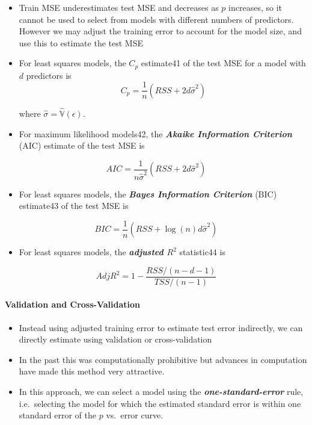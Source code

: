 \documentclass[11pt]{article}
\providecommand{\tightlist}{%
      \setlength{\itemsep}{0pt}\setlength{\parskip}{0pt}}
\begin{document}
    \begin{itemize}
\item
  Train MSE underestimates test MSE and decreases as \(p\) increases, so
  it cannot be used to select from models with different numbers of
  predictors. However we may adjust the training error to account for
  the model size, and use this to estimate the test MSE
\item
  For least squares models, the \textbf{\emph{\(C_p\)}} estimate41 of
  the test MSE for a model with \(d\) predictors is
  \[ C_p = \frac{1}{n}(RSS + 2d\hat{\sigma}^2) \]

  where \(\hat{\sigma} = \hat{\mathbb{V}}(\epsilon)\).
\item
  For maximum likelihood models42, the \textbf{\emph{Akaike Information
  Criterion}} (AIC) estimate of the test MSE is
\end{itemize}

\[ AIC = \frac{1}{n\hat{\sigma}^2}(RSS + 2d\hat{\sigma}^2) \]

\begin{itemize}
\tightlist
\item
  For least squares models, the \textbf{\emph{Bayes Information
  Criterion}} (BIC) estimate43 of the test MSE is
\end{itemize}

\[ BIC = \frac{1}{n}(RSS + \log(n)d\hat{\sigma}^2) \]

\begin{itemize}
\tightlist
\item
  For least squares models, the \textbf{\emph{adjusted \(R^2\)}}
  statistic44 is
\end{itemize}

\[AdjR^2 = 1 - \frac{RSS/(n - d - 1)}{TSS/(n - 1)}\]

    \hypertarget{validation-and-cross-validation}{%
\paragraph{Validation and
Cross-Validation}\label{validation-and-cross-validation}}

    \begin{itemize}
\tightlist
\item
  Instead using adjusted training error to estimate test error
  indirectly, we can directly estimate using validation or
  cross-validation
\item
  In the past this was computationally prohibitive but advances in
  computation have made this method very attractive.
\item
  In this approach, we can select a model using the
  \textbf{\emph{one-standard-error}} rule, i.e.~selecting the model for
  which the estimated standard error is within one standard error of the
  \(p\) vs.~error curve.
\end{itemize}
\end{document}
